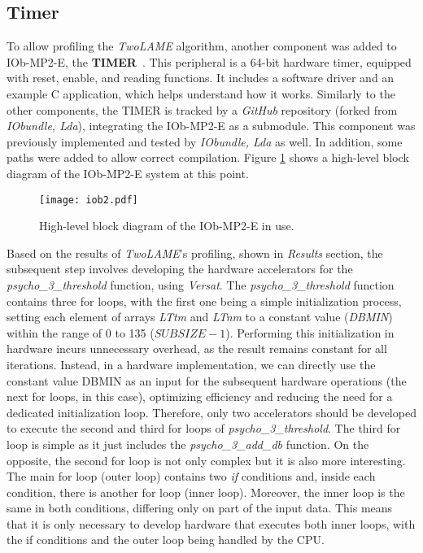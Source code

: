 \subsection{Timer}
To allow profiling the \textit{TwoLAME} algorithm, another component was added to IOb-MP2-E, the \textbf{TIMER}~\cite{bib:iobtimer}. This peripheral is a 64-bit hardware timer, equipped with reset, enable, and reading functions. It includes a software driver and an example C application, which helps understand how it works. 
Similarly to the other components, the TIMER is tracked by a \textit{GitHub} repository (forked from \textit{IObundle, Lda}), integrating the IOb-MP2-E as a submodule. This component was previously implemented and tested by \textit{IObundle, Lda} as well. In addition, some paths were added to allow correct compilation. 
Figure \ref{fig:newiob1} shows a high-level block diagram of the IOb-MP2-E system at this point.

\vspace{0.1cm}

\begin{figure}[H]
\centerline{\texttt{[image: iob2.pdf]}}
\caption{High-level block diagram of the IOb-MP2-E in use.}
\label{fig:newiob1}
\end{figure}

\vspace{0.1cm}

Based on the results of \textit{TwoLAME}'s profiling, shown in \textit{Results} section, the subsequent step involves developing the hardware accelerators for the \textit{psycho\_3\_threshold} function, using \textit{Versat}.
The \textit{psycho\_3\_threshold} function contains three for loops, with the first one being a simple initialization process, setting each element of arrays \textit{LTtm} and \textit{LTnm} to a constant value (\textit{DBMIN}) within the range of 0 to 135 ($SUBSIZE-1$). Performing this initialization in hardware incurs unnecessary overhead, as the result remains constant for all iterations. Instead, in a hardware implementation, we can directly use the constant value DBMIN as an input for the subsequent hardware operations (the next for loops, in this case), optimizing efficiency and reducing the need for a dedicated initialization loop.
Therefore, only two accelerators should be developed to execute the second and third for loops of \textit{psycho\_3\_threshold}.
The third for loop is simple as it just includes the \textit{psycho\_3\_add\_db} function. 
On the opposite, the second for loop is not only complex but it is also more interesting. The main for loop (outer loop) contains two \textit{if} conditions and, inside each condition, there is another for loop (inner loop). Moreover, the inner loop is the same in both conditions, differing only on part of the input data. This means that it is only necessary to develop hardware that executes both inner loops, with the if conditions and the outer loop being handled by the CPU.

